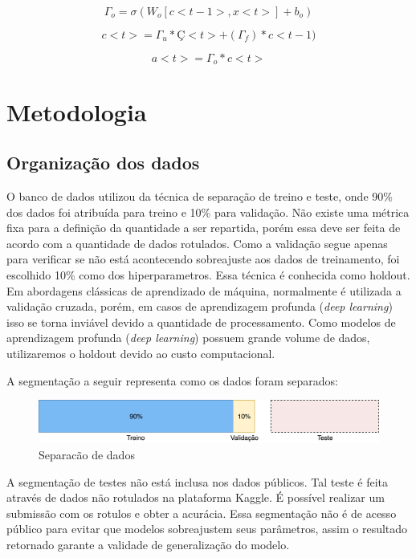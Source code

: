\documentclass[12pt]{article}
\begin{document}
\begin{equation}
    \Gamma_o = \sigma(W_o[c<t-1>, x<t>]+b_o)
\end{equation}

\begin{equation}
    c<t>=\Gamma_u*Ç<t>+(\Gamma_f)*c<t-1)
\end{equation}

\begin{equation}
    a<t>=\Gamma_o*c<t>
\end{equation}

\section{Metodologia}

\subsection{Organização dos dados}

O banco de dados utilizou da técnica de separação de treino e teste, onde 90\% dos dados foi atribuída para treino e 10\% para validação. Não existe uma métrica fixa para a definição da quantidade a ser repartida, porém essa deve ser feita de acordo com a quantidade de dados rotulados. Como a validação segue apenas para verificar se não está acontecendo sobreajuste aos dados de treinamento, foi escolhido 10\% como dos hiperparametros. Essa técnica é conhecida como holdout. Em abordagens clássicas de aprendizado de máquina, normalmente é utilizada a validação cruzada, porém, em casos de aprendizagem profunda (\textit{deep learning}) isso se torna inviável devido a quantidade de processamento. Como modelos de aprendizagem profunda (\textit{deep learning}) possuem grande volume de dados, utilizaremos o holdout devido ao custo computacional.

A segmentação a seguir representa como os dados foram separados:

\begin{figure}[ht]
\centering
\includegraphics[width=1\textwidth]{images/datasplit.png}
\caption{Separacão de dados}
\label{fig:datasplit}
\end{figure}

A segmentação de testes não está inclusa nos dados públicos. Tal teste é feita através de dados não rotulados na plataforma Kaggle. É possível realizar um submissão com os rotulos e obter a acurácia. Essa segmentação não é de acesso público para evitar que modelos sobreajustem seus parâmetros, assim o resultado retornado garante a validade de generalização do modelo.
\end{document}
